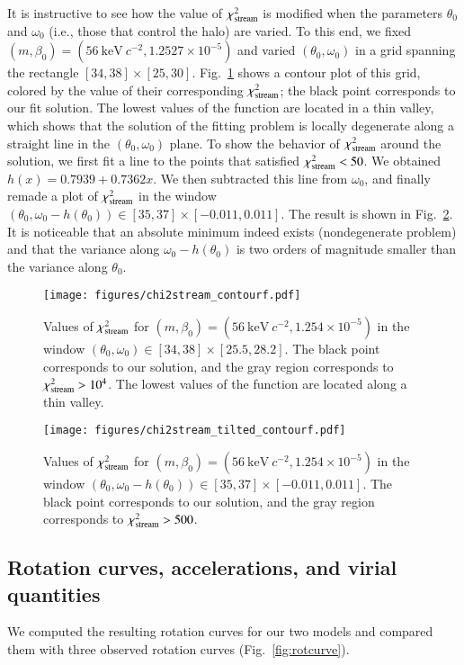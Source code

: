 \documentclass[twocolumn]{aa}
\begin{document}
It is instructive to see how the value of $\chi^2_{\rm{stream}}$ is modified when the parameters $\theta_0$ and $\omega_0$ (i.e., those that control the halo) are varied. To this end, we fixed $(m, \beta_0)=(56~\mathrm{keV}~c^{-2}, 1.2527\times10^{-5})$ and varied $(\theta_0, \omega_0)$ in a grid spanning the rectangle $[34, 38]\times[25, 30]$.
Fig.~\ref{fig:chi2stream} shows a contour plot of this grid, colored by the value of their corresponding $\chi^2_{\rm{stream}}$; the black point corresponds to our fit solution.
The lowest values of the function are located in a thin valley, which shows that the solution of the fitting problem is locally degenerate along a straight line in the $(\theta_0, \omega_0)$ plane.
To show the behavior of $\chi^2_{\rm{stream}}$ around the solution, we first fit a line to the points that satisfied $\chi^2_{\rm{stream}}<50$. We
obtained $h(x)= 0.7939+0.7362x$. We then subtracted this line from $\omega_0$, and finally remade a plot of $\chi^2_{\rm{stream}}$ in the window $(\theta_0, \omega_0-h(\theta_0))\in[35, 37]\times[-0.011,0.011]$. The result is shown in Fig.~\ref{fig:chi2stream_tilted}. It is noticeable that an absolute minimum indeed exists (nondegenerate problem) and that the variance along $\omega_0-h(\theta_0)$ is two orders of magnitude smaller than the variance along $\theta_0$.
%
\begin{figure}
   \centering
   \texttt{[image: figures/chi2stream\_contourf.pdf]}
   \caption{Values of $\chi^2_{\rm{stream}}$ for $(m, \beta_0)=(56~\mathrm{keV}~c^{-2}, 1.254\times10^{-5})$ in the window $(\theta_0, \omega_0)\in[34, 38]\times[25.5,28.2]$. The black point corresponds to our solution, and the gray region corresponds to $\chi^2_{\rm{stream}} >10^4$. The lowest values of the function are located along a thin valley.}
   \label{fig:chi2stream}
\end{figure}
\begin{figure}
   \centering
   \texttt{[image: figures/chi2stream\_tilted\_contourf.pdf]}
   \caption{Values of $\chi^2_{\rm{stream}}$ for $(m, \beta_0)=(56~\mathrm{keV}~c^{-2}, 1.254\times10^{-5})$ in
   the window $(\theta_0, \omega_0-h(\theta_0))\in[35, 37]\times[-0.011,0.011]$. The black point corresponds to our solution, and the gray region corresponds to $\chi^2_{\rm{stream}} > 500 $. }
   \label{fig:chi2stream_tilted}
\end{figure}

\subsection{Rotation curves, accelerations, and virial quantities}
We computed the resulting rotation curves for our two models and compared them with three observed rotation curves (Fig.~\ref{fig:rotcurve}).
\end{document}
